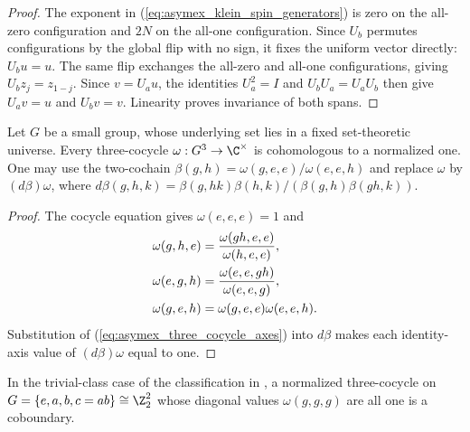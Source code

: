 \begin{proof}
    \leanok
    The exponent in (\ref{eq:asymex_klein_spin_generators}) is zero on
    the all-zero configuration and $2N$ on the all-one configuration.
    Since $U_b$ permutes configurations by the global flip with no sign, it
    fixes the uniform vector directly: $U_bu=u$. The same flip exchanges the
    all-zero and all-one configurations, giving $U_bz_j=z_{1-j}$.
    Since $v=U_au$, the identities $U_a^2=I$ and $U_bU_a=U_aU_b$ then give $U_av=u$ and $U_bv=v$.
    Linearity proves invariance of both spans.
\end{proof}

\begin{lemma}
    \label{thm:asymex_three_cocycle_normalization}
    \leanok
    Let $G$ be a small group, whose underlying set lies in a fixed
    set-theoretic universe. Every three-cocycle $\omega:G^3\to\C^\times$ is cohomologous to a
    normalized one. One may use the two-cochain
    $\beta(g,h)=\omega(g,e,e)/\omega(e,e,h)$ and replace $\omega$ by
    $(d\beta)\omega$, where
    $d\beta(g,h,k)=\beta(g,hk)\beta(h,k)/(\beta(g,h)\beta(gh,k))$.
\end{lemma}

\begin{proof}
    \leanok
    The cocycle equation gives $\omega(e,e,e)=1$ and
    \begin{align}
        \label{eq:asymex_three_cocycle_axes}
        \omega(g,h,e) & =\frac{\omega(gh,e,e)}{\omega(h,e,e)},       \\
        \omega(e,g,h) & =\frac{\omega(e,e,gh)}{\omega(e,e,g)},\notag \\
        \omega(g,e,h) & =\omega(g,e,e)\omega(e,e,h).\notag
    \end{align}
    Substitution of (\ref{eq:asymex_three_cocycle_axes}) into $d\beta$
    makes each identity-axis value of $(d\beta)\omega$ equal to one.
\end{proof}

\begin{lemma}
    \label{thm:asymex_klein_trivial_diagonal}
    \leanok
    In the trivial-class case of the classification in
    \cite[Section~6]{GarreRubio2023MPOSym}, a normalized three-cocycle on
    $G=\{e,a,b,c=ab\}\cong\Z_2^2$ whose diagonal values $\omega(g,g,g)$ are
    all one is a coboundary.
\end{lemma}

